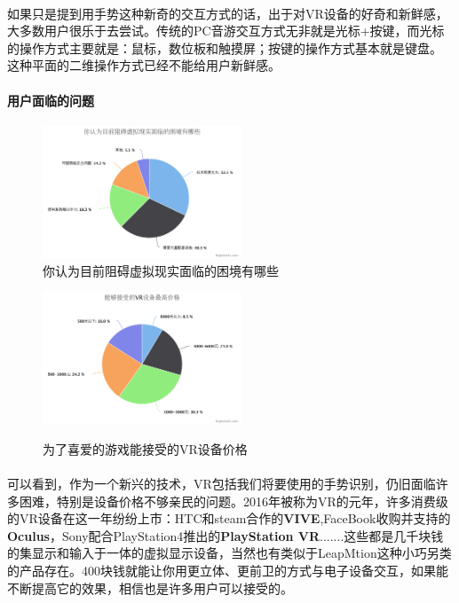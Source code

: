 \documentclass{article}
\begin{document}
\paragraph{}
如果只是提到用手势这种新奇的交互方式的话，出于对VR设备的好奇和新鲜感，大多数用户很乐于去尝试。传统的PC音游交互方式无非就是光标+按键，而光标的操作方式主要就是：鼠标，数位板和触摸屏；按键的操作方式基本就是键盘。
这种平面的二维操作方式已经不能给用户新鲜感。
\paragraph{用户面临的问题}
\begin{figure}[H]
  \begin{minipage}{0.5\linewidth}
    \includegraphics[width=16em]{chart7.png}\\
    \caption{你认为目前阻碍虚拟现实面临的困境有哪些}\label{2-6}
  \end{minipage}
  \begin{minipage}{0.5\linewidth}
    \includegraphics[width=16em]{chart8.png}\\
    \caption{为了喜爱的游戏能接受的VR设备价格}\label{2-7}
  \end{minipage}
\end{figure}
\paragraph{}
可以看到，作为一个新兴的技术，VR包括我们将要使用的手势识别，仍旧面临许多困难，特别是设备价格不够亲民的问题。2016年被称为VR的元年，许多消费级的VR设备在这一年纷纷上市：HTC和steam合作的\textbf{VIVE},FaceBook收购并支持的\textbf{Oculus}，Sony配合PlayStation4推出的\textbf{PlayStation VR}.......这些都是几千块钱的集显示和输入于一体的虚拟显示设备，当然也有类似于LeapMtion这种小巧另类的产品存在。400块钱就能让你用更立体、更前卫的方式与电子设备交互，如果能不断提高它的效果，相信也是许多用户可以接受的。
\end{document}
